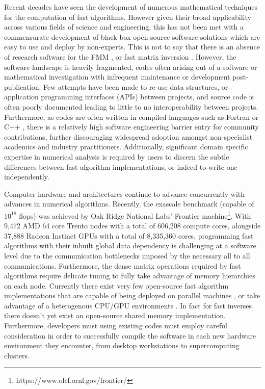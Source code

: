 Recent decades have seen the development of numerous mathematical techniques for the computation of fast algorithms. However given their broad applicability across various fields of science and engineering, this has not been met with a commensurate development of black box open-source software solutions which are easy to use and deploy by non-experts. This is not to say that there is an absence of research software for the FMM \cite{kailasa2022pyexafmm, exafmm,wang2021exafmm,malhotra2015pvfmm, fmm3d}, or fast matrix inversion \cite{fmm3dbie, strongskel, ho2020flam}. However, the software landscape is heavily fragmented, codes often arising out of a software or mathematical investigation with infrequent maintenance or development post-publication. Few attempts have been made to re-use data structures, or application programming interfaces (APIs) between projects, and source code is often poorly documented leading to little to no interoperability between projects. Furthermore, as codes are often written in compiled languages such as Fortran \cite{fmm3d} or C++ \cite{malhotra2015pvfmm, exafmm,wang2021exafmm}, there is a relatively high software engineering barrier entry for community contributions, further discouraging widespread adoption amongst non-specialist academics and industry practitioners. Additionally, significant domain specific expertise in numerical analysis is required by users to discern the subtle differences between fast algorithm implementations, or indeed to write one independently. 

Computer hardware and architectures continue to advance concurrently with advances in numerical algorithms. Recently, the exascale benchmark (capable of $10^{18}$ flops) was achieved by Oak Ridge National Labs' Frontier machine\footnote{https://www.olcf.ornl.gov/frontier/}. With  9,472 AMD 64 core Trento nodes with a total of 606,208 compute cores, alongside 37,888 Radeon Instinct GPUs with a total of 8,335,360 cores, programming fast algorithms with their inbuilt global data dependency is challenging at a software level due to the communication bottlenecks imposed by the necessary all to all communications. Furthermore, the dense matrix operations required by fast algorithms require delicate tuning to fully take advantage of memory hierarchies on each node. Currently there exist very few open-source fast algorithm implementations that are capable of being deployed on parallel machines \cite{malhotra2015pvfmm, exafmm,}, or take advantage of a heterogenous CPU/GPU environments \cite{exafmm, h2lib2016github}. In fact for fast inverses there doesn't yet exist an open-source shared memory implementation. Furthermore, developers must using existing codes must employ careful consideration in order to successfully compile the software in each new hardware environment they encounter, from desktop workstations to supercomputing clusters.

